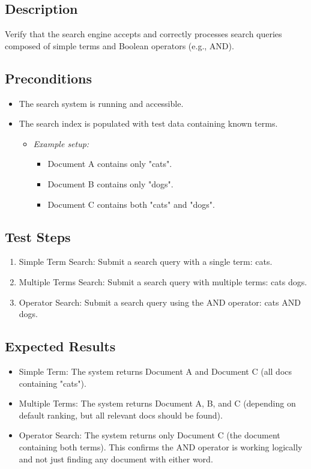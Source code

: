 \documentclass{article}
\begin{document}
\subsection*{Description}
Verify that the search engine accepts and correctly processes search queries composed of simple terms and Boolean operators (e.g., AND).

\subsection*{Preconditions}
\begin{itemize}
  \item The search system is running and accessible.
  \item The search index is populated with test data containing known terms.
  \begin{itemize}
    \item[] \textit{Example setup:}
    \begin{itemize}
        \item Document A contains only "cats".
        \item Document B contains only "dogs".
        \item Document C contains both "cats" and "dogs".
    \end{itemize}
  \end{itemize}
\end{itemize}

\subsection*{Test Steps}
\begin{enumerate}
  \item Simple Term Search: Submit a search query with a single term: cats.
  \item Multiple Terms Search: Submit a search query with multiple terms: cats dogs.
  \item Operator Search: Submit a search query using the AND operator: cats AND dogs.
\end{enumerate}

\subsection*{Expected Results}
\begin{itemize}
  \item Simple Term: The system returns Document A and Document C (all docs containing "cats").
  \item Multiple Terms: The system returns Document A, B, and C (depending on default ranking, but all relevant docs should be found).
  \item Operator Search: The system returns only Document C (the document containing both terms). This confirms the AND operator is working logically and not just finding any document with either word.
\end{itemize}
\end{document}
